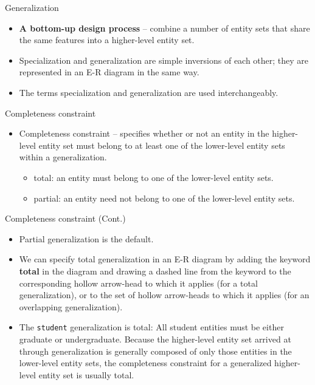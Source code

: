 \documentclass{beamer}
\begin{document}
\begin{frame}{Generalization}
    \begin{itemize}
        \item \textbf{A bottom-up design process} – combine a number of entity sets that share the same features into a higher-level entity set.
        \item Specialization and generalization are simple inversions of each other; they are represented in an E-R diagram in the same way.
        \item The terms specialization and generalization are used interchangeably.
    \end{itemize}
\end{frame}

\begin{frame}{Completeness constraint}
    \begin{itemize}
        \item Completeness constraint -- specifies whether or not an entity in the higher-level entity set must belong to at least one of the lower-level entity sets within a generalization.
        \begin{itemize}
            \item total: an entity must belong to one of the lower-level entity sets.
            \item partial: an entity need not belong to one of the lower-level entity sets.
        \end{itemize}
    \end{itemize}
\end{frame}

\begin{frame}{Completeness constraint (Cont.)}
    \begin{itemize}
        \item Partial generalization is the default.
        \item We can specify total generalization in an E-R diagram by adding the keyword \textbf{total} in the diagram and drawing a dashed line from the keyword to the corresponding hollow arrow-head to which it applies (for a total generalization), or to the set of hollow arrow-heads to which it applies (for an overlapping generalization).
        \item The \texttt{student} generalization is total: All student entities must be either graduate or undergraduate. Because the higher-level entity set arrived at through generalization is generally composed of only those entities in the lower-level entity sets, the completeness constraint for a generalized higher-level entity set is usually total.
    \end{itemize}
\end{frame}
\end{document}
